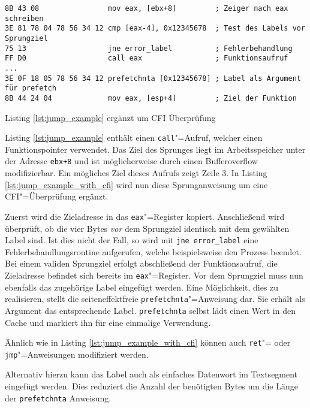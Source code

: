 \begin{listing}[ht]
\begin{verbatim}
8B 43 08                mov eax, [ebx+8]         ; Zeiger nach eax schreiben
3E 81 78 04 78 56 34 12 cmp [eax-4], 0x12345678  ; Test des Labels vor Sprungziel
75 13                   jne error_label          ; Fehlerbehandlung
FF D0                   call eax                 ; Funktionsaufruf
...
3E 0F 18 05 78 56 34 12 prefetchnta [0x12345678] ; Label als Argument für prefetch
8B 44 24 04             mov eax, [esp+4]         ; Ziel der Funktion
\end{verbatim}
\caption{Listing \ref{lst:jump_example} ergänzt um CFI Überprüfung}
\label{lst:jump_example_with_cfi}
\end{listing}

Listing \ref{lst:jump_example} enthält einen \texttt{call}"=Aufruf, welcher einen Funktionspointer verwendet. Das Ziel des Sprunges liegt im Arbeitsspeicher unter der Adresse \texttt{ebx+8} und ist möglicherweise durch einen Bufferoverflow modifizierbar. Ein mögliches Ziel dieses Aufrufs zeigt Zeile 3. In Listing \ref{lst:jump_example_with_cfi} wird nun diese Sprunganweisung um eine CFI"=Überprüfung ergänzt.

Zuerst wird die Zieladresse in das \texttt{eax}"=Register kopiert. Anschließend wird überprüft, ob die vier Bytes \emph{vor} dem Sprungziel identisch mit dem gewählten Label sind. Ist dies nicht der Fall, so wird mit \texttt{jne error_label} eine Fehlerbehandlungsroutine aufgerufen, welche beispielsweise den Prozess beendet. Bei einem validen Sprungziel erfolgt abschließend der Funktionsaufruf, die Zieladresse befindet sich bereits im \texttt{eax}"=Register. Vor dem Sprungziel muss nun ebenfalls das zugehörige Label eingefügt werden. Eine Möglichkeit, dies zu realisieren, stellt die seiteneffektfreie \texttt{prefetchnta}"=Anweisung dar. Sie erhält als Argument das entsprechende Label. \texttt{prefetchnta} selbst lädt einen Wert in den Cache und markiert ihn für eine einmalige Verwendung.

Ähnlich wie in Listing \ref{lst:jump_example_with_cfi} können auch \texttt{ret}"= oder \texttt{jmp}"=Anweisungen modifiziert werden.

Alternativ hierzu kann das Label auch als einfaches Datenwort im Textsegment eingefügt werden. Dies reduziert die Anzahl der benötigten Bytes um die Länge der
\texttt{prefetchnta} Anweisung.

